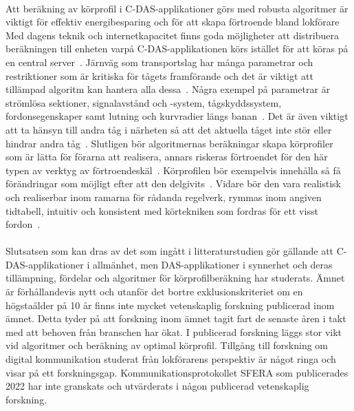\paragraph{}
\hspace{-13pt}
Att beräkning av körprofil i C-DAS-applikationer görs med robusta algoritmer är viktigt för effektiv energibesparing och för att skapa förtroende bland lokförare~\cite{Albrecht2013}
Med dagens teknik och internetkapacitet finns goda möjligheter att distribuera beräkningen till enheten varpå C-DAS-applikationen körs istället för att köras på en central server~\cite{Albrecht2013, Rahn2013}.
Järnväg som transportslag har många parametrar och restriktioner som är kritiska för tågets framförande och det är viktigt att tillämpad algoritm kan hantera alla dessa~\cite{Albrecht2013}.
Några exempel på parametrar är strömlösa sektioner, signalavstånd och -system, tågskyddssystem, fordonsegenskaper samt lutning och kurvradier längs banan~\cite{Albrecht2013, Rahn2013, IRS90940, Sfera-message-poster-2022}.
Det är även viktigt att ta hänsyn till andra tåg i närheten så att det aktuella tåget inte stör eller hindrar andra tåg~\cite{Albrecht2013}.
Slutligen bör algoritmernas beräkningar skapa körprofiler som är lätta för förarna att realisera, annars riskeras förtroendet för den här typen av verktyg av förtroendeskäl~\cite{Albrecht2013, Rahn2013}.
Körprofilen bör exempelvis innehålla så få förändringar som möjligt efter att den delgivits~\cite{Albrecht2013, Rahn2013}.
Vidare bör den vara realistisk och realiserbar inom ramarna för rådanda regelverk, rymmas inom angiven tidtabell, intuitiv och konsistent med körtekniken som fordras för ett visst fordon~\cite{Albrecht2013, Rahn2013}.
\paragraph{}
\hspace{-12pt}
Slutsatsen som kan dras av det som ingått i litteraturstudien gör gällande att C-DAS-applikationer i allmänhet, men DAS-applikationer i synnerhet och deras tillämpning, fördelar och algoritmer för körprofilberäkning har studerats.
Ämnet är förhållandevis nytt och utanför det bortre exklusionskriteriet om en högstaålder på 10 år finns inte mycket vetenskaplig forskning publicerad inom ämnet.
Detta tyder på att forskning inom ämnet tagit fart de senaste åren i takt med att behoven från branschen har ökat.
I publicerad forskning läggs stor vikt vid algoritmer och beräkning av optimal körprofil.
Tillgång till forskning om digital kommunikation studerat från lokförarens perspektiv är något ringa och visar på ett forskningsgap.
Kommunikationsprotokollet SFERA som publicerades 2022 har inte granskats och utvärderats i någon publicerad vetenskaplig forskning.
%

